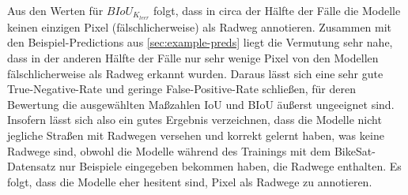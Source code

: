 Aus den Werten für $BIoU_{K_{leer}}$ folgt, dass in circa der Hälfte der Fälle die Modelle keinen einzigen Pixel 
(fälschlicherweise) als Radweg annotieren. Zusammen mit den Beispiel-Predictions aus \autoref{sec:example-preds} 
liegt die Vermutung sehr nahe, dass in der anderen Hälfte der Fälle nur sehr wenige Pixel von den Modellen 
fälschlicherweise als Radweg erkannt wurden. Daraus lässt sich eine sehr gute True-Negative-Rate und 
geringe False-Positive-Rate schließen, 
für deren Bewertung die ausgewählten Maßzahlen IoU und BIoU äußerst ungeeignet sind. Insofern lässt sich 
also ein gutes Ergebnis verzeichnen, dass die Modelle nicht jegliche Straßen mit Radwegen versehen und 
korrekt gelernt haben, was keine Radwege sind, obwohl die Modelle während des Trainings mit dem BikeSat-Datensatz 
nur Beispiele eingegeben bekommen haben, die Radwege enthalten. Es folgt, dass die Modelle eher hesitent sind,
Pixel als Radwege zu annotieren.  

